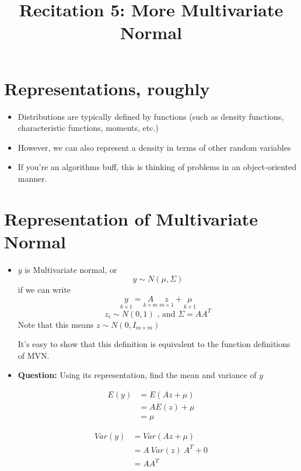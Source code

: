 \documentclass[12pt]{article}
\title{Recitation 5: More Multivariate Normal}
\date{}
\author{}
\begin{document}
\maketitle	

\vspace{-30pt}

\section{Representations, roughly}
\begin{itemize}
	\item Distributions are typically defined by functions (such as density functions, characteristic functions, moments, etc.)
	\item However, we can also represent a density in terms of other random variables\footnotemark {}
	\item If you're an algorithms buff, this is thinking of problems in an object-oriented manner.
\end{itemize}

\section{Representation of Multivariate Normal}
\begin{itemize}
	\item $y$ is Multivariate normal, or 
	$$y \sim N(\mu, \Sigma)$$
	if we can write 
	\begin{equation*}
	\underset{k\times 1}{y} =  \underset{k\times m}{A} \  
	\underset{m\times 1}{z} + \underset{k\times 1}{\mu}
	\end{equation*}
	$$z_i \sim N(0,1) \text{ ,\ \ and \ \ } \Sigma = AA^T$$
	Note that this means $z \sim N(0,I_{m \times m})$
	
	It's easy to show that this definition is equivalent to the function definitions of MVN.
	
	\item \textbf{Question:} Using its representation, find the mean and variance of $y$
\end{itemize}

\begin{align*}
	E(y) &= E(Az + \mu) \\
		 &= AE(z) + \mu \\
		 &= \mu
\end{align*}

\begin{align*}
 Var(y) &= Var(Az + \mu) \\
		&= A\ Var(z)\ A^T + 0 \\
		&= AA^T
\end{align*}
\end{document}
